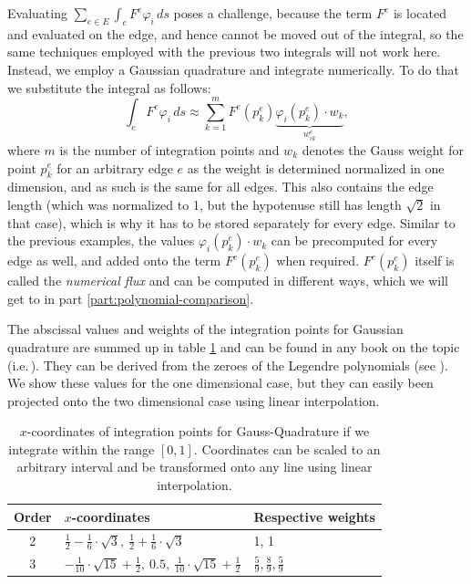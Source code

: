 \documentclass[a4paper, twoside]{article}
\renewcommand{\phi}{\varphi}
\begin{document}
Evaluating $\sum_{e \in E} \int_{e} F^e \phi_i \, ds$ poses a challenge, because the term $F^e$ is located and evaluated on the edge, and hence cannot be moved out of the integral, so the same techniques employed with the previous two integrals will not work here. Instead, we employ a Gaussian quadrature and integrate numerically. To do that we substitute the integral as follows:
\begin{equation}
  \int_{e} F^e \phi_i \, ds \approx \sum_{k=1}^{m} F^e\left(p_k^e\right) \underbrace{\phi_i\left(p_k^e\right) \cdot w_k}_{w_{ik}^e},
\end{equation}
where $m$ is the number of integration points and $w_k$ denotes the Gauss weight for point $p_k^e$ for an arbitrary edge $e$ as the weight is determined normalized in one dimension, and as such is the same for all edges. This also contains the edge length (which was normalized to 1, but the hypotenuse still has length $\sqrt{2}$ in that case), which is why it has to be stored separately for every edge. Similar to the previous examples, the values $\phi_i\left(p_k^e\right) \cdot w_k$ can be precomputed for every edge as well, and added onto the term $F^e\left(p_k^e\right)$ when required. $F^e\left(p_k^e\right)$ itself is called the \emph{numerical flux} and can be computed in different ways, which we will get to in part \ref{part:polynomial-comparison}.

The abscissal values and weights of the integration points for Gaussian quadrature are summed up in table \ref{tab:x-coordinates-gauss-quadrature} and can be found in any book on the topic (i.e.\,\cite{hans2009schwarz}). They can be derived from the zeroes of the Legendre polynomials (see \cite{abramowitzstegun1964handbook}). We show these values for the one dimensional case, but they can easily been projected onto the two dimensional case using linear interpolation.

\begin{table}[ht]
  \renewcommand\arraystretch{1.5}
  \centering
  \begin{tabular}[ht]{cll}
    Order & $x$-coordinates & Respective weights \\
    \hline
    2 & $\frac{1}{2}-\frac{1}{6}\cdot \sqrt{3},\  \frac{1}{2}+\frac{1}{6}\cdot \sqrt{3}$ & 1, 1\\
    3 & $-\frac{1}{10}\cdot \sqrt{15}+\frac{1}{2} ,\  0.5,\  \frac{1}{10}\cdot \sqrt{15}+\frac{1}{2}$ & $\frac{5}{9}, \frac{8}{9}, \frac{5}{9}$ \\
    \hline
  \end{tabular}
  \caption{$x$-coordinates of integration points for Gauss-Quadrature if we integrate within the range $\left[ 0,1 \right]$. Coordinates can be scaled to an arbitrary interval and be transformed onto any line using linear interpolation.}
  \label{tab:x-coordinates-gauss-quadrature}
\end{table}
\end{document}
